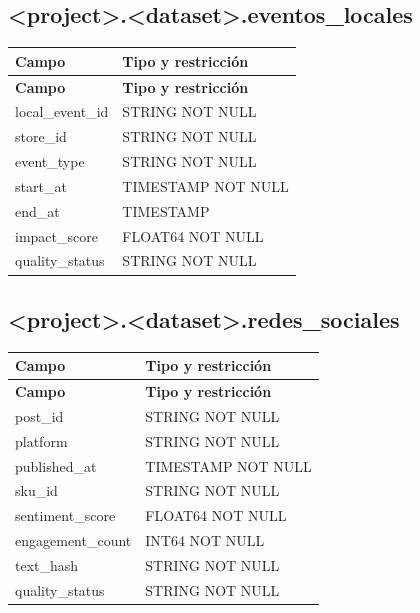 \documentclass[11pt]{article}
\begin{document}
\subsection{<project>.<dataset>.eventos\_\allowbreak{}locales}

\begingroup\small
\begin{longtable}{@{}>{\raggedright\arraybackslash}p{}>{\raggedright\arraybackslash}p{}@{}}
\toprule
\textbf{Campo} & \textbf{Tipo y restricción} \\
\midrule
\endfirsthead
\toprule
\textbf{Campo} & \textbf{Tipo y restricción} \\
\midrule
\endhead
local\_\allowbreak{}event\_\allowbreak{}id & STRING NOT NULL \\
store\_\allowbreak{}id & STRING NOT NULL \\
event\_\allowbreak{}type & STRING NOT NULL \\
start\_\allowbreak{}at & TIMESTAMP NOT NULL \\
end\_\allowbreak{}at & TIMESTAMP \\
impact\_\allowbreak{}score & FLOAT64 NOT NULL \\
quality\_\allowbreak{}status & STRING NOT NULL \\
\bottomrule
\end{longtable}
\endgroup

\subsection{<project>.<dataset>.redes\_\allowbreak{}sociales}

\begingroup\small
\begin{longtable}{@{}>{\raggedright\arraybackslash}p{}>{\raggedright\arraybackslash}p{}@{}}
\toprule
\textbf{Campo} & \textbf{Tipo y restricción} \\
\midrule
\endfirsthead
\toprule
\textbf{Campo} & \textbf{Tipo y restricción} \\
\midrule
\endhead
post\_\allowbreak{}id & STRING NOT NULL \\
platform & STRING NOT NULL \\
published\_\allowbreak{}at & TIMESTAMP NOT NULL \\
sku\_\allowbreak{}id & STRING NOT NULL \\
sentiment\_\allowbreak{}score & FLOAT64 NOT NULL \\
engagement\_\allowbreak{}count & INT64 NOT NULL \\
text\_\allowbreak{}hash & STRING NOT NULL \\
quality\_\allowbreak{}status & STRING NOT NULL \\
\bottomrule
\end{longtable}
\endgroup
\end{document}
